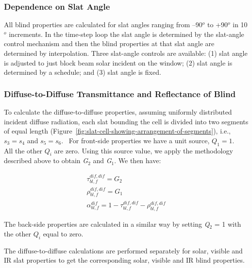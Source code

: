 \subsubsection{Dependence on Slat Angle}\label{dependence-on-slat-angle}

All blind properties are calculated for slat angles ranging from --90\(^{o}\) to +90\(^{o}\) in 10\(^{o}\) increments. In the time-step loop the slat angle is determined by the slat-angle control mechanism and then the blind properties at that slat angle are determined by interpolation. Three slat-angle controls are available: (1) slat angle is adjusted to just block beam solar incident on the window; (2) slat angle is determined by a schedule; and (3) slat angle is fixed.

\subsubsection{Diffuse-to-Diffuse Transmittance and Reflectance of Blind}\label{diffuse-to-diffuse-transmittance-and-reflectance-of-blind}

To calculate the diffuse-to-diffuse properties, assuming uniformly distributed incident diffuse radiation, each slat bounding the cell is divided into two segments of equal length (Figure~\ref{fig:slat-cell-showing-arrangement-of-segments}), i.e., \({s_3} = {s_4}\) and \({s_5} = {s_6}\).~ For front-side properties we have a unit source, \({Q_1} = 1\).~ All the other \({Q_i}\) are zero. Using this source value, we apply the methodology described above to obtain \emph{G\(_{2}\)} and \emph{G\(_{1}\)}. We then have:

\begin{equation}
\begin{array}{l}\tau_{bl,f}^{dif,dif} = {G_2}\\\rho_{bl,f}^{dif,dif} = {G_1}\\\alpha_{bl,f}^{dif} = 1 - \tau_{bl,f}^{dif,dif} - \rho_{bl,f}^{dif,dif}\end{array}
\end{equation}

The back-side properties are calculated in a similar way by setting \emph{Q\(_{2}\)} = 1 with the other \({Q_i}\) equal to zero.

The diffuse-to-diffuse calculations are performed separately for solar, visible and IR slat properties to get the corresponding solar, visible and IR blind properties.

